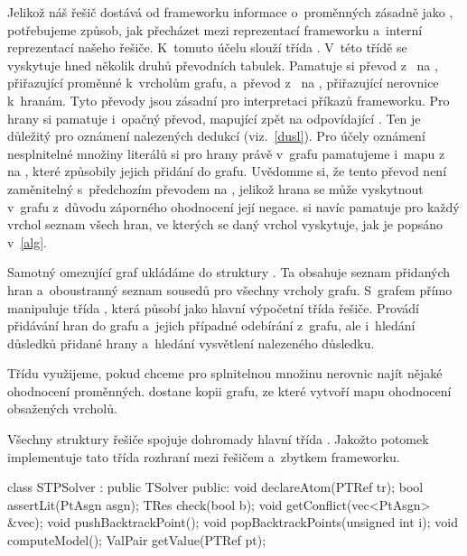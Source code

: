 Jelikož náš řešič dostává od frameworku informace o~proměnných zásadně jako , potřebujeme způsob, jak přecházet mezi reprezentací frameworku a~interní reprezentací našeho řešiče. K~tomuto účelu slouží třída . V~této třídě se vyskytuje hned několik druhů převodních tabulek. Pamatuje si převod z~ na , přiřazující proměnné k~vrcholům grafu, a~převod z~ na , přiřazující nerovnice k~hranám. Tyto převody jsou zásadní pro interpretaci příkazů frameworku. Pro hrany si pamatuje i~opačný převod, mapující  zpět na odpovídající . Ten je důležitý pro oznámení nalezených dedukcí (viz.~\ref{dusl}). Pro účely oznámení nesplnitelné množiny literálů si pro hrany právě v~grafu pamatujeme i~mapu z~ na , které způsobily jejich přidání do grafu. Uvědomme si, že tento převod není zaměnitelný s~předchozím převodem na , jelikož hrana se může vyskytnout v~grafu z~důvodu záporného ohodnocení její negace.  si navíc pamatuje pro každý vrchol seznam všech hran, ve kterých se daný vrchol vyskytuje, jak je popsáno v~\ref{alg}.

Samotný omezující graf ukládáme do struktury . Ta obsahuje seznam přidaných hran a~oboustranný seznam sousedů pro všechny vrcholy grafu. S~grafem přímo manipuluje třída , která působí jako hlavní výpočetní třída řešiče. Provádí přidávání hran do grafu a~jejich případné odebírání z~grafu, ale i~hledání důsledků přidané hrany a~hledání vysvětlení nalezeného důsledku.

Třídu  využijeme, pokud chceme pro splnitelnou množinu nerovnic najít nějaké ohodnocení proměnných.  dostane kopii grafu, ze které vytvoří mapu ohodnocení obsažených vrcholů.

Všechny struktury řešiče spojuje dohromady hlavní třída . Jakožto potomek  implementuje tato třída rozhraní mezi řešičem a~zbytkem frameworku. %
\begin{code}[labelposition=bottomline,label=Základní API třídy STPSolver]
class STPSolver : public TSolver {
public:
	void declareAtom(PTRef tr);
	bool assertLit(PtAsgn asgn);
	TRes check(bool b);
	void getConflict(vec<PtAsgn> &vec);
	void pushBacktrackPoint();
	void popBacktrackPoints(unsigned int i);
	void computeModel();
	ValPair getValue(PTRef pt);
}
\end{code}

